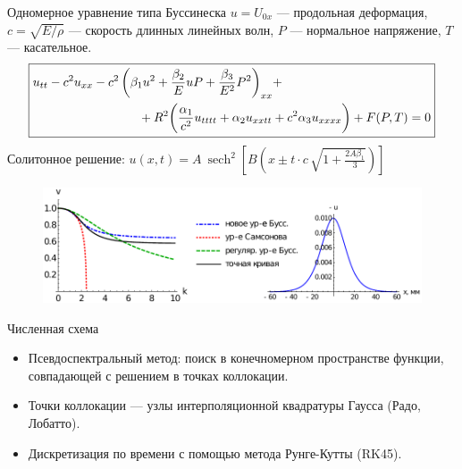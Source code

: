 \documentclass[usenames,dvipsnames]{beamer}
\DeclareMathOperator{\sech}{sech}
\begin{document}
\begin{frame}{Одномерное уравнение типа Буссинеска}
$u = U_{0x}$ --- продольная деформация, $c = \sqrt{E/\rho}$ --- скорость длинных линейных волн, $P$ --- нормальное напряжение, $T$ --- касательное.
\small
\begin{equation*}
\boxed{\begin{split}
&u_{tt} - c^2 u_{xx} - {\color{black}c^2\left(\beta_1 u^2 + \frac{\beta_2}{E} u P + \frac{\beta_3}{E^2} P^2\right)_{xx}} +\\
&\hspace{30mm} + {\color{black}R^2 \bigg(\frac{\alpha_1}{c^2} u_{tttt} + \alpha_2 u_{xxtt} + c^2\alpha_3 u_{xxxx} \bigg)} + F(P, T) = 0
\end{split}}
\end{equation*}
\normalsize 
Солитонное решение: $u(x,t) = A\ \sech^2\left[B \left(x\pm t\cdot c\,\sqrt{1+\frac{2A \beta_1}{3}}\right) \right]$
\begin{figure}
\vspace{-6mm}
\includegraphics[width=1.02\linewidth]{Figures/Disp_Sol}
\end{figure}

\end{frame}


\begin{frame}{Численная схема}
\begin{minipage}{\textwidth}
\begin{itemize}
	\item Псевдоспектральный метод: поиск в конечномерном пространстве функции, совпадающей с решением в точках коллокации.
	\item Точки коллокации --- узлы интерполяционной квадратуры Гаусса (Радо, Лобатто).
	\item Дискретизация по времени с помощью метода Рунге-Кутты (RK45).
\end{itemize}
\end{minipage}
\end{frame}
\end{document}
